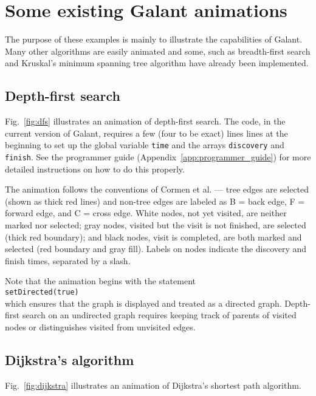 \section{Some existing Galant animations}
\label{app:galant_animations}

The purpose of these examples is mainly to illustrate the capabilities of
Galant. Many other algorithms are easily animated and some, such as
breadth-first search and Kruskal's minimum spanning tree algorithm have
already been implemented.

\subsection{Depth-first search}

Fig.~\ref{fig:dfs} illustrates an animation of depth-first search.
The code, in the current version of Galant, requires a few (four to be exact) lines lines at the beginning to set up the global variable \verb$time$ and the arrays \verb$discovery$ and \verb$finish$.
See the programmer guide (Appendix~\ref{app:programmer_guide}) for more
detailed instructions on how to do this properly.

The animation follows the conventions of Cormen et al. --- tree edges are selected (shown as thick red lines) and non-tree edges are labeled as B = back edge,
F = forward edge, and C = cross edge.
White nodes, not yet visited,
are neither marked nor selected;
gray nodes, visited but the visit is not finished, are selected
(thick red boundary);
and black nodes, visit is completed, are both marked and selected (red boundary and gray fill).
Labels on nodes indicate the discovery and finish times, separated by a slash.

Note that the animation begins with the statement\\
\hspace{3em} \verb+setDirected(true)+\\
which ensures that the graph is displayed and treated as a directed graph.
Depth-first search on an undirected graph requires keeping track of parents of visited nodes
or distinguishes visited from unvisited edges.



\subsection{Dijkstra's algorithm}

Fig.~\ref{fig:dijkstra} illustrates an animation of Dijkstra's shortest path algorithm.

